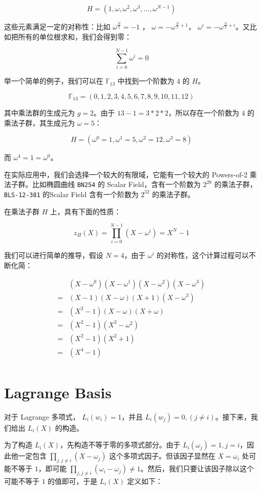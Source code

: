 \[
H=(1,\omega,\omega^2,\omega^3,\ldots,\omega^{N-1})
\]

这些元素满足一定的对称性：比如 \(\omega^{\frac{N}{2}}=-1\) ，
\(\omega=-\omega^{\frac{N}{2}+1}\)，
\(\omega^i=-\omega^{\frac{N}{2}+i}\)。又比如把所有的单位根求和，我们会得到零：

\[
\sum_{i=0}^{N-1}\omega^i=0
\]

举一个简单的例子，我们可以在 \(\mathbb{F}_{13}\) 中找到一个阶数为 \(4\)
的 \(H\)。

\[
\mathbb{F}_{13}=(0,1,2,3,4,5,6,7,8,9,10,11,12)
\]

其中乘法群的生成元为 \(g=2\)。由于 \(13-1=3*2*2\)，所以存在一个阶数为
\(4\) 的乘法子群，其生成元为 \(\omega=5\)：

\[
H=(\omega^0=1,\omega^1=5,\omega^2=12,\omega^3=8)
\]

而 \(\omega^4=1=\omega^0\)。

在实际应用中，我们会选择一个较大的有限域，它能有一个较大的 Powers-of-2
乘法子群。比如椭圆曲线 \texttt{BN254} 的 Scalar Field，含有一个阶数为
\(2^{28}\) 的乘法子群，\texttt{BLS-12-381} 的Scalar Field 含有一个阶数为
\(2^{32}\) 的乘法子群。

在乘法子群 \(H\) 上，具有下面的性质：

\[
z_H(X)=\prod_{i=0}^{N-1}(X-\omega^i)=X^N-1
\]

我们可以进行简单的推导，假设 \(N = 4\)，由于 \(\omega^i\)
的对称性，这个计算过程可以不断化简：

\[
\begin{split}
&(X-\omega^0)(X-\omega^1)(X-\omega^2)(X-\omega^3) \\
=& (X-1)(X-\omega)(X+1)(X-\omega^{3})  \\
=& (X^2-1)(X-\omega)(X+\omega) \\
=& (X^2-1)(X^2-\omega^2) \\
=& (X^2-1)(X^2+1) \\
=& (X^4-1) \\
\end{split}
\]

\hypertarget{lagrange-basis}{%
\section{Lagrange Basis}\label{lagrange-basis}}

对于 Lagrange 多项式， \(L_i(w_i)=1\)，并且
\(L_i(w_j)=0, (j\neq i)\)。接下来，我们给出 \(L_i(X)\) 的构造。

为了构造 \(L_i(X)\)，先构造不等于零的多项式部分。由于
\(L_i(\omega_j)=1, j = i\)，因此他一定包含
\(\prod_{j,j\neq i}(X-\omega_j)\) 这个多项式因子。但该因子显然在
\(X=\omega_i\) 处可能不等于 \(1\)，即可能
\(\prod_{j, j\neq i}(\omega_i-\omega_j)\neq 1\)。然后，我们只要让该因子除以这个可能不等于
\(1\) 的值即可，于是 \(L_i(X)\) 定义如下：

